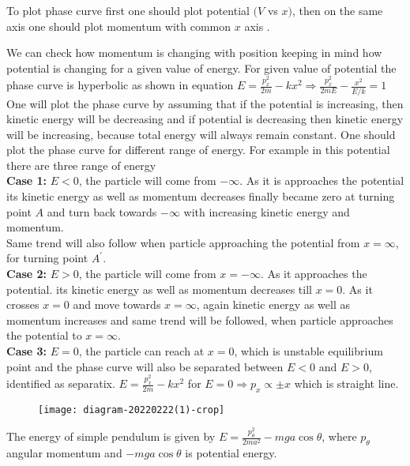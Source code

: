 \begin{answer}
	To plot phase curve first one should plot potential $(V$ vs $x)$, then on the same axis one should plot momentum with common $x$ axis .
	
	We can check how momentum is changing with position keeping in mind how potential is changing for a given value of energy. For given value of potential the phase curve is hyperbolic as shown in equation $E=\frac{p_{x}^{2}}{2 m}-k x^{2} \Rightarrow \frac{p_{x}^{2}}{2 m E}-\frac{x^{2}}{E / k}=1$\\
	One will plot the phase curve by assuming that if the potential is increasing, then kinetic energy will be decreasing and if potential is decreasing then kinetic energy will be increasing, because total energy will always remain constant. One should plot the phase curve for different range of energy. For example in this potential there are three range of energy\\
	\textbf{Case 1:} $E<0$, the particle will come from $-\infty .$ As it is approaches the potential its kinetic energy as well as momentum decreases finally became zero at turning point $A$ and turn back towards $-\infty$ with increasing kinetic energy and momentum.\\
	Same trend will also follow when particle approaching the potential from $x=\infty$, for turning point $A^{\prime}$.\\
	\textbf{Case 2:} $E>0$, the particle will come from $x=-\infty$. As it approaches the potential. its kinetic energy as well as momentum decreases till $x=0$. As it crosses $x=0$ and move towards $x=\infty$, again kinetic energy as well as momentum increases and same trend will be followed, when particle approaches the potential to $x=\infty$.\\
	\textbf{Case 3:} $E=0$, the particle can reach at $x=0$, which is unstable equilibrium point and the phase curve will also be separated between $E<0$ and $E>0$, identified as separatix. $E=\frac{p_{x}^{2}}{2 m}-k x^{2}$ for $E=0 \Rightarrow p_{x} \propto \pm x$ which is straight line.\\
	\begin{figure}[H]
		\centering
		\texttt{[image: diagram-20220222(1)-crop]}
	\end{figure}
\end{answer}
\begin{example}
	The energy of simple pendulum is given by $E=\frac{p_{\theta}^{2}}{2 m a^{2}}-m g a \cos \theta$, where $p_{\theta}$ angular momentum and $-m g a \cos \theta$ is potential energy.
\end{example}
